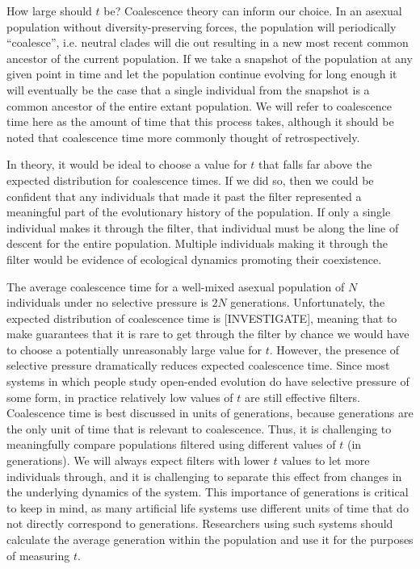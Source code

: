 \documentclass[letterpaper]{article}
\begin{document}
How large should $t$ be? Coalescence theory can inform our choice. In an asexual population without diversity-preserving forces, the population will periodically ``coalesce'', i.e. neutral clades will die out resulting in a new most recent common ancestor of the current population. If we take a snapshot of the population at any given point in time and let the population continue evolving for long enough it will eventually be the case that a single individual from the snapshot is a common ancestor of the entire extant population. We will refer to coalescence time here as the amount of time that this process takes, although it should be noted that coalescence time more commonly thought of retrospectively. 

In theory, it would be ideal to choose a value for $t$ that falls far above the expected distribution for coalescence times. If we did so, then we could be confident that any individuals that made it past the filter represented a meaningful part of the evolutionary history of the population. If only a single individual makes it through the filter, that individual must be along the line of descent for the entire population. Multiple individuals making it through the filter would be evidence of ecological dynamics promoting their coexistence.
    
The average coalescence time for a well-mixed asexual population of $N$ individuals under no selective pressure is $2N$ generations.  Unfortunately, the expected distribution of coalescence time is [INVESTIGATE], meaning that to make guarantees that it is rare to get through the filter by chance we would have to choose a potentially unreasonably large value for $t$. However, the presence of selective pressure dramatically reduces expected coalescence time. Since most systems in which people study open-ended evolution do have selective pressure of some form, in practice relatively low values of $t$ are still effective filters.
%
%
Coalescence time is best discussed in units of generations, because generations are the only unit of time that is relevant to coalescence. Thus, it is challenging to meaningfully compare populations filtered using different values of $t$ (in generations). We will always expect filters with lower $t$ values to let more individuals through, and it is challenging to separate this effect from changes in the underlying dynamics of the system. This importance of generations is critical to keep in mind, as many artificial life systems use different units of time that do not directly correspond to generations. Researchers using such systems should calculate the average generation within the population and use it for the purposes of measuring $t$.
\end{document}
